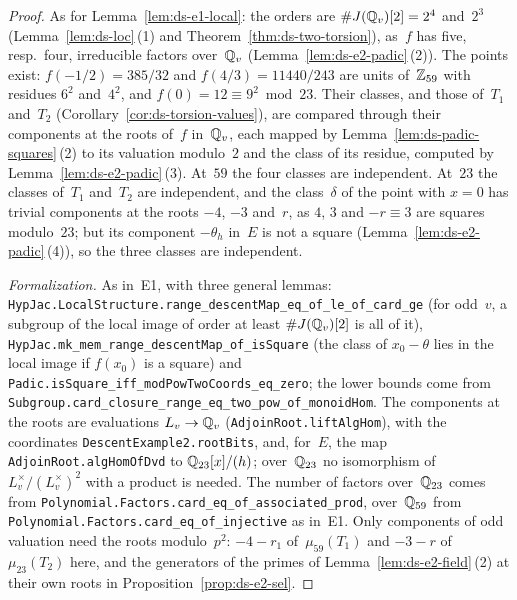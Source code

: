 \begin{proof}
\leanok
{}
As for Lemma~\ref{lem:ds-e1-local}: the orders are $\#J(\mathbb{Q}_v)[2] = 2^4$ and~$2^3$
(Lemma~\ref{lem:ds-loc}\,(1) and Theorem~\ref{thm:ds-two-torsion}), as~$f$ has five, resp.~four,
irreducible factors over~$\mathbb{Q}_v$ (Lemma~\ref{lem:ds-e2-padic}\,(2)). The points exist:
$f(-1/2) = 385/32$ and $f(4/3) = 11440/243$ are units of~$\mathbb{Z}_{59}$ with residues $6^2$ and~$4^2$,
and $f(0) = 12 \equiv 9^2 \bmod 23$. Their classes, and those of~$T_1$ and~$T_2$
(Corollary~\ref{cor:ds-torsion-values}), are compared through their components at the roots
of~$f$ in~$\mathbb{Q}_v$, each mapped by Lemma~\ref{lem:ds-padic-squares}\,(2) to its valuation
modulo~$2$ and the class of its residue, computed by Lemma~\ref{lem:ds-e2-padic}\,(3). At~$59$
the four classes are independent. At~$23$ the classes of~$T_1$ and~$T_2$ are independent, and
the class~$\delta$ of the point with $x = 0$ has trivial components at the roots $-4$, $-3$
and~$r$, as $4$, $3$ and $-r \equiv 3$ are squares modulo~$23$; but its component $-\theta_h$
in~$E$ is not a square (Lemma~\ref{lem:ds-e2-padic}\,(4)), so the three classes are independent.

\emph{Formalization.} As in~E1, with three general lemmas:
\texttt{HypJac.LocalStructure.range\_descentMap\_eq\_of\_le\_of\_card\_ge} (for odd~$v$, a subgroup
of the local image of order at least $\#J(\mathbb{Q}_v)[2]$ is all of it),
\texttt{HypJac.mk\_mem\_range\_descentMap\_of\_isSquare} (the class of $x_0 - \theta$ lies in the
local image if $f(x_0)$ is a square) and \texttt{Padic.isSquare\_iff\_modPowTwoCoords\_eq\_zero};
the lower bounds come from \texttt{Subgroup.card\_closure\_range\_eq\_two\_pow\_of\_monoidHom}. The
components at the roots are evaluations $L_v \to \mathbb{Q}_v$ (\texttt{AdjoinRoot.liftAlgHom}), with the
coordinates \texttt{DescentExample2.rootBits}, and, for~$E$, the map
\texttt{AdjoinRoot.algHomOfDvd} to $\mathbb{Q}_{23}[x]/(h)$; over~$\mathbb{Q}_{23}$ no isomorphism of
$L_v^\times/(L_v^\times)^2$ with a product is needed. The number of factors over~$\mathbb{Q}_{23}$ comes
from \texttt{Polynomial.Factors.card\_eq\_of\_associated\_prod}, over~$\mathbb{Q}_{59}$ from
\texttt{Polynomial.Factors.card\_eq\_of\_injective} as in~E1. Only components of odd valuation
need the roots modulo~$p^2$: $-4 - r_1$ of~$\mu_{59}(T_1)$ and $-3 - r$ of~$\mu_{23}(T_2)$ here,
and the generators of the primes of Lemma~\ref{lem:ds-e2-field}\,(2) at their own roots in
Proposition~\ref{prop:ds-e2-sel}.
\end{proof}

